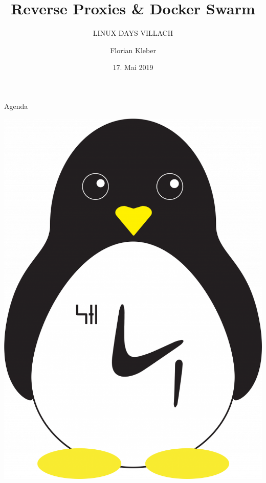 \documentclass[10pt, unknownkeysallowed]{beamer}
\title{Reverse Proxies \& Docker Swarm}
\subtitle{LINUX DAYS VILLACH}
\author[FK]{Florian Kleber}
\institute[HTL-Villach IT]{Höhere technische Bundeslehr- und Versuchsanstalt Villach}
\date{17. Mai 2019}
\begin{document}
\maketitle

\begin{frame}{Agenda}
\begin{minipage}{.45\textwidth}
    \tableofcontents[]
\end{minipage}
\hfill
\begin{minipage}{.45\textwidth}
    \includegraphics[width=\linewidth,center]{LinuxPinguin2.png}
\end{minipage}
\end{frame}
\end{document}
